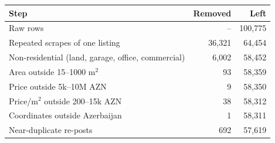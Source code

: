 \begin{tabular}{@{}lrr@{}}
\toprule
Step & Removed & Left \\
\midrule
Raw rows & -- & 100,775 \\
Repeated scrapes of one listing & 36,321 & 64,454 \\
Non-residential (land, garage, office, commercial) & 6,002 & 58,452 \\
Area outside 15--1000 m$^2$ & 93 & 58,359 \\
Price outside 5k--10M AZN & 9 & 58,350 \\
Price/m$^2$ outside 200--15k AZN & 38 & 58,312 \\
Coordinates outside Azerbaijan & 1 & 58,311 \\
Near-duplicate re-posts & 692 & 57,619 \\
\bottomrule
\end{tabular}
